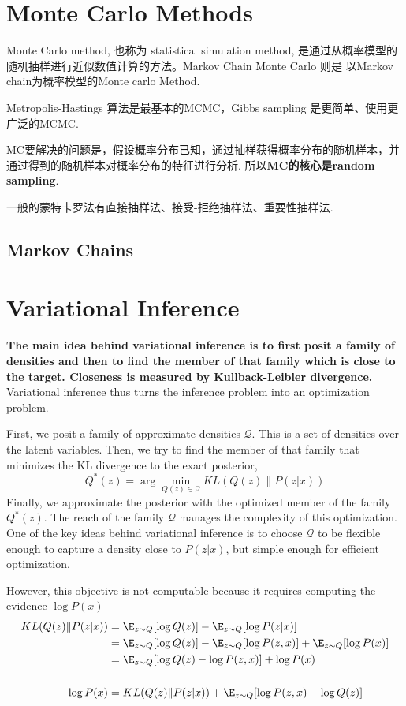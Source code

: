 \section{Monte Carlo Methods}
Monte Carlo method, 也称为 statistical simulation method, 是通过从概率模型的随机抽样进行近似数值计算的方法。Markov Chain Monte Carlo 则是
以Markov chain为概率模型的Monte carlo Method.

Metropolis-Hastings 算法是最基本的MCMC，Gibbs sampling 是更简单、使用更广泛的MCMC.

MC要解决的问题是，假设概率分布已知，通过抽样获得概率分布的随机样本，并通过得到的随机样本对概率分布的特征进行分析. 所以\textbf{MC的核心是random sampling}.

一般的蒙特卡罗法有直接抽样法、接受-拒绝抽样法、重要性抽样法. \cite{lihang2019}

\subsection{Markov Chains}

\section{Variational Inference}

\textbf{The main idea behind variational inference is to first posit a family of densities and then to find the member of that family which is close to
the target. Closeness is measured by Kullback-Leibler divergence.} Variational inference thus turns the
inference problem into an optimization problem.

First, we posit a family of approximate densities $\mathcal{Q}$. This is a set of densities over the latent
variables. Then, we try to find the member of that family that minimizes the KL divergence to the exact posterior,
\begin{equation}
    Q^*(z) = \arg \min_{Q(z) \in \mathcal{Q}} KL(Q(z)\|P(z|x))
\end{equation}
Finally, we approximate the posterior with the optimized member of the family $Q^*(z)$. The reach of the family $\mathcal{Q}$ manages the complexity of this
optimization. One of the key ideas behind variational inference is to choose $\mathcal{Q}$ to be flexible enough to capture a density close to $P(z|x)$, but
simple enough for efficient optimization.

However, this objective is not computable because it requires computing the evidence $\log P(x)$
\begin{equation}
    \begin{split}
        KL(Q(z)\|P(z|x))
        &= \E_{z \sim Q} [\log Q(z)] - \E_{z \sim Q} [\log P(z|x)] \\
        &= \E_{z \sim Q} [\log Q(z)] - \E_{z \sim Q} [\log P(z, x)] + \E_{z \sim Q}[\log P(x)]\\
        &= \E_{z \sim Q} [\log Q(z) - \log P(z, x)] + \log P(x) \\
        \\
        \log P(x)
        &= KL(Q(z)\|P(z|x)) + \E_{z \sim Q} [\log P(z, x) - \log Q(z)]
    \end{split}
\end{equation}

